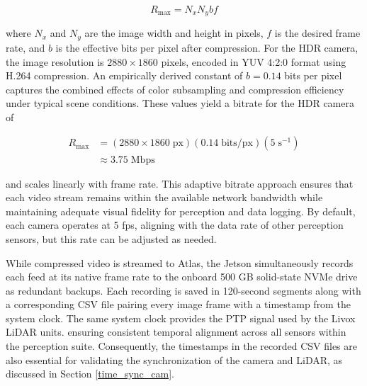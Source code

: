 \documentclass{erauthesis}
\begin{document}
\begin{equation}
    R_{\text{max}} = N_x N_y b f
\end{equation}

where $N_x$ and $N_y$ are the image width and height in pixels, $f$ is the desired frame rate, and $b$ is the effective bits per pixel after compression.
For the HDR camera, the image resolution is $2880 \times 1860$ pixels, encoded in YUV 4:2:0 format using H.264 compression.
An empirically derived constant of $b = 0.14$ bits per pixel captures the combined effects of color subsampling and compression efficiency under typical scene conditions.
These values yield a bitrate for the HDR camera of

\begin{equation*}
    \begin{split}
        R_{\text{max}} & = (2880 \times 1860\; \text{px}) (0.14 \;\text{bits/px})(5\;\text{s}^{-1})  \\
        & \approx 3.75\; \text{Mbps}
    \end{split}
\end{equation*}

and scales linearly with frame rate.
This adaptive bitrate approach ensures that each video stream remains within the available network bandwidth while maintaining adequate visual fidelity for perception and data logging.
By default, each camera operates at 5 \ac{fps}, aligning with the data rate of other perception sensors, but this rate can be adjusted as needed. %



While compressed video is streamed to Atlas, the Jetson simultaneously records each feed at its native frame rate to the onboard 500 GB solid-state NVMe drive as redundant backups. 
Each recording is saved in 120-second segments along with a corresponding \ac{CSV} file pairing every image frame with a timestamp from the system clock. 
The same system clock provides the \ac{PTP} signal used by the Livox LiDAR units. ensuring consistent temporal alignment across all sensors within the perception suite. 
Consequently, the timestamps in the recorded \ac{CSV} files are also essential for validating the synchronization of the camera and LiDAR, as discussed in Section \ref{time_sync_cam}.
\end{document}
